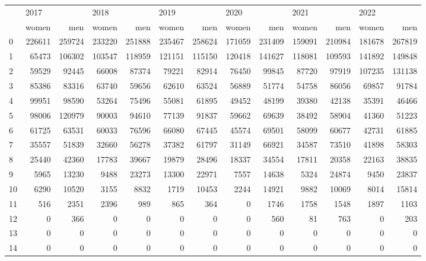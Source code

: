 \begin{tabular}{lrrrrrrrrrrrr}
\toprule
{} & \multicolumn{2}{l}{2017} & \multicolumn{2}{l}{2018} & \multicolumn{2}{l}{2019} & \multicolumn{2}{l}{2020} & \multicolumn{2}{l}{2021} & \multicolumn{2}{l}{2022} \\
{} &   women &     men &   women &     men &   women &     men &   women &     men &   women &     men &   women &     men \\
\midrule
0  &  226611 &  259724 &  233220 &  251888 &  235467 &  258624 &  171059 &  231409 &  159091 &  210984 &  181678 &  267819 \\
1  &   65473 &  106302 &  103547 &  118959 &  121151 &  115150 &  120418 &  141627 &  118081 &  109593 &  141892 &  149848 \\
2  &   59529 &   92445 &   66008 &   87374 &   79221 &   82914 &   76450 &   99845 &   87720 &   97919 &  107235 &  131138 \\
3  &   85386 &   83316 &   63740 &   59656 &   62610 &   63524 &   56889 &   51774 &   54758 &   86056 &   69857 &   91784 \\
4  &   99951 &   98590 &   53264 &   75496 &   55081 &   61895 &   49452 &   48199 &   39380 &   42138 &   35391 &   46466 \\
5  &   98006 &  120979 &   90003 &   94610 &   77139 &   91837 &   59662 &   69639 &   38492 &   58904 &   41360 &   51223 \\
6  &   61725 &   63531 &   60033 &   76596 &   66080 &   67445 &   45574 &   69501 &   58099 &   60677 &   42731 &   61885 \\
7  &   35557 &   51839 &   32660 &   56278 &   37382 &   61797 &   31149 &   66921 &   34587 &   73510 &   41898 &   58303 \\
8  &   25440 &   42360 &   17783 &   39667 &   19879 &   28496 &   18337 &   34554 &   17811 &   20358 &   22163 &   38835 \\
9  &    5965 &   13230 &    9488 &   23273 &   13300 &   22971 &    7557 &   14638 &    5324 &   24874 &    9450 &   23837 \\
10 &    6290 &   10520 &    3155 &    8832 &    1719 &   10453 &    2244 &   14921 &    9882 &   10069 &    8014 &   15814 \\
11 &     516 &    2351 &    2396 &     989 &     865 &     364 &       0 &    1746 &    1758 &    1548 &    1897 &    1103 \\
12 &       0 &     366 &       0 &       0 &       0 &       0 &       0 &     560 &      81 &     763 &       0 &     203 \\
13 &       0 &       0 &       0 &       0 &       0 &       0 &       0 &       0 &       0 &       0 &       0 &       0 \\
14 &       0 &       0 &       0 &       0 &       0 &       0 &       0 &       0 &       0 &       0 &       0 &       0 \\
\bottomrule
\end{tabular}
